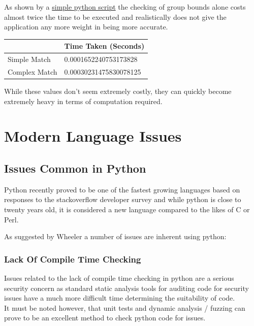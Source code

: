 \documentclass{IEEEtran}
\begin{document}
                As shown by a \hyperref[sec:PyReDoS]{\color{blue}simple python script} the checking of 
                group bounds alone costs almost twice the time to be executed and realistically 
                does not give the application any more weight in being more accurate.
                \begin{table}[H]
                    \centering
                    \begin{tabular}{|l|l|}
                    \hline
                                  & Time Taken (Seconds)   \\ \hline
                    Simple Match  & 0.0001652240753173828  \\ \hline
                    Complex Match & 0.00030231475830078125 \\ \hline
                    \end{tabular}
                \end{table}

                While these values don't seem extremely costly, they can quickly become extremely heavy in
                terms of computation required.

    \newpage
    \section{Modern Language Issues}
        \subsection{Issues Common in Python}
            Python recently proved to be one of the fastest growing languages based on responses to 
            the stackoverflow developer survey\cite{Stackoverflow-Survey} and while python is close to 
            twenty years old, it is considered a new language compared to the likes of C or Perl.

            As suggested by Wheeler\cite{Wheeler} a number of issues are inherent using python:
            \subsubsection{Lack Of Compile Time Checking}
                Issues related to the lack of compile time checking in python are a serious security
                concern as standard static analysis tools for auditing code for security issues 
                have a much more difficult time determining the suitability of code.
                \\
                It must be noted however, that unit tests and dynamic analysis / fuzzing can prove
                to be an excellent method to check python code for issues.
\end{document}
